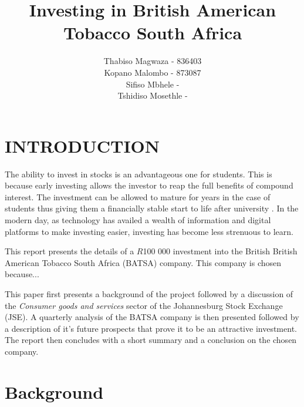\documentclass[letterpaper, 10 pt, conference]{ieeeconf}  %
\title{\LARGE \bf
Investing in British American Tobacco South Africa 
}
\author{Thabiso Magwaza - 836403 \\ Kopano Malombo - 873087\\ Sifiso Mbhele - \\ Tshidiso Mosethle - }
\begin{document}
\maketitle
\thispagestyle{empty}
\pagestyle{empty}


\begin{abstract}

\end{abstract}


\section{INTRODUCTION}

The ability to invest in stocks is an advantageous one for students. This is because early investing allows the investor to reap the full benefits of compound interest. The investment can be allowed to mature for years in the case of students thus giving them a financially stable start to life after university \cite{earlyInvestment}. In the modern day, as technology has availed a wealth of information and digital platforms to make investing easier, investing has become less strenuous to learn. 

This report presents the details of a $R$100 000 investment into the British British American Tobacco South Africa (BATSA) company. This company is chosen because...

This paper first presents a background of the project followed by a discussion of the \textit{Consumer goods and services} sector of the Johannesburg Stock Exchange (JSE). A quarterly analysis of the BATSA company is then presented followed by a description of it's future prospects that prove it to be an attractive investment. The report then concludes with a short summary and a conclusion on the chosen company. 

\section{Background}
\end{document}
